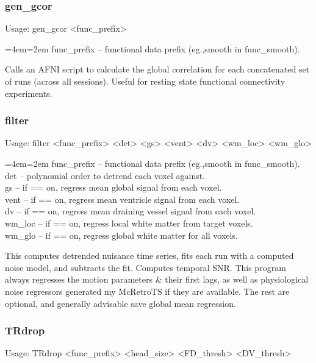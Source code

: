 \documentclass[final,titlepage,letterpaper,oneside,12pt]{article}
\renewcommand{\texttt}[2][BrickRed]{\textcolor{#1}{\ttfamily #2}}%
\newenvironment{blockquote}{%
  \par%
  \medskip
  \leftskip=4em\rightskip=2em%
  \noindent\ignorespaces}{%
  \par\medskip}
\begin{document}
\subsubsection{gen\_gcor}
Usage: \texttt{gen\_gcor <func\_prefix>}

\begin{blockquote}
func\_prefix -- functional data prefix (eg.,smooth in func\_smooth).
\end{blockquote}

\noindent Calls an AFNI script to calculate the global correlation for each concatenated set of runs (across all sessions). Useful for resting state functional connectivity experiments.

\subsubsection{filter}
Usage: \texttt{filter <func\_prefix> <det> <gs> <vent> <dv> <wm\_loc> <wm\_glo>}

\begin{blockquote}
func\_prefix -- functional data prefix (eg.,smooth in func\_smooth). \\
det -- polynomial order to detrend each voxel against. \\
gs -- if == on, regress mean global signal from each voxel. \\
vent -- if == on, regress mean ventricle signal from each voxel. \\
dv -- if == on, regress mean draining vessel signal from each voxel. \\
wm\_loc -- if == on, regress local white matter from target voxels. \\
wm\_glo -- if == on, regress global white matter for all voxels. \

\end{blockquote}

\noindent This computes detrended nuisance time series, fits each run with a computed noise model, and subtracts the fit. Computes temporal SNR. This program always regresses the motion parameters \& their first lags, as well as physiological noise regressors generated my McRetroTS if they are available. The rest are optional, and generally advisable save global mean regression.

\subsubsection{TRdrop}
Usage: \texttt{TRdrop <func\_prefix> <head\_size> <FD\_thresh> <DV\_thresh>}
\end{document}
